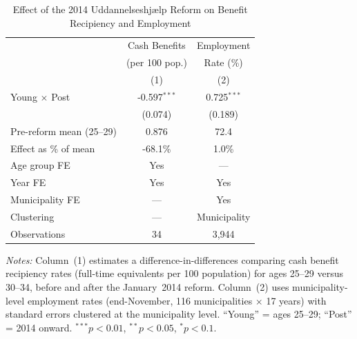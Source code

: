 \begin{table}[htbp]
\centering
\caption{Effect of the 2014 Uddannelseshjælp Reform on Benefit Recipiency and Employment}
\label{tab:main}
\begin{tabular}{lcc}
\toprule
 & Cash Benefits & Employment \\
 & (per 100 pop.) & Rate (\%) \\
 & (1) & (2) \\
\midrule
Young $\times$ Post & -0.597$^{***}$ & 0.725$^{***}$ \\
 & (0.074) & (0.189) \\
\addlinespace
Pre-reform mean (25--29) & 0.876 & 72.4 \\
Effect as \% of mean & -68.1\% & 1.0\% \\
Age group FE & Yes & --- \\
Year FE & Yes & Yes \\
Municipality FE & --- & Yes \\
Clustering & --- & Municipality \\
Observations & 34 & 3,944 \\
\bottomrule
\end{tabular}
\begin{tablenotes}
\item \textit{Notes:} Column~(1) estimates a difference-in-differences comparing cash benefit recipiency rates (full-time equivalents per 100 population) for ages 25--29 versus 30--34, before and after the January~2014 reform. Column~(2) uses municipality-level employment rates (end-November, 116 municipalities $\times$ 17 years) with standard errors clustered at the municipality level. ``Young'' = ages 25--29; ``Post'' = 2014 onward. $^{***}p<0.01$, $^{**}p<0.05$, $^{*}p<0.1$.
\end{tablenotes}
\end{table}

